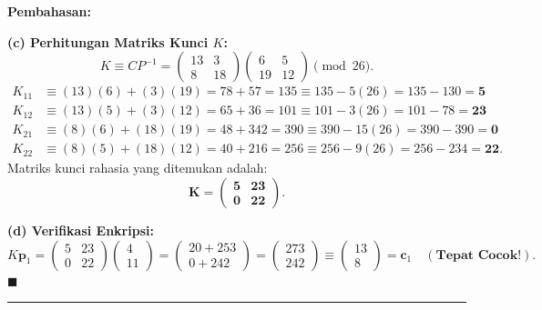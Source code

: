 \documentclass[11pt,a4paper]{article}
\newenvironment{solusi}{\noindent\textbf{\textsf{Pembahasan:}}\par\vspace{0.2em}}{\hfill$\blacksquare$\vspace{1em}\par\hrule\vspace{1em}}
\begin{document}
\begin{solusi}
\vspace{0.2cm}
\textbf{(c) Perhitungan Matriks Kunci $K$:}
\[
K \equiv C P^{-1} = \begin{pmatrix} 13 & 3 \\ 8 & 18 \end{pmatrix} \begin{pmatrix} 6 & 5 \\ 19 & 12 \end{pmatrix} \pmod{26}.
\]
\begin{align*}
K_{11} &\equiv (13)(6) + (3)(19) = 78 + 57 = 135 \equiv 135 - 5(26) = 135 - 130 = \mathbf{5} \\
K_{12} &\equiv (13)(5) + (3)(12) = 65 + 36 = 101 \equiv 101 - 3(26) = 101 - 78 = \mathbf{23} \\
K_{21} &\equiv (8)(6) + (18)(19) = 48 + 342 = 390 \equiv 390 - 15(26) = 390 - 390 = \mathbf{0} \\
K_{22} &\equiv (8)(5) + (18)(12) = 40 + 216 = 256 \equiv 256 - 9(26) = 256 - 234 = \mathbf{22}.
\end{align*}
Matriks kunci rahasia yang ditemukan adalah:
\[
\mathbf{K = \begin{pmatrix} 5 & 23 \\ 0 & 22 \end{pmatrix}}.
\]

\vspace{0.2cm}
\textbf{(d) Verifikasi Enkripsi:}
\[
K \mathbf{p}_1 = \begin{pmatrix} 5 & 23 \\ 0 & 22 \end{pmatrix} \begin{pmatrix} 4 \\ 11 \end{pmatrix} = \begin{pmatrix} 20 + 253 \\ 0 + 242 \end{pmatrix} = \begin{pmatrix} 273 \\ 242 \end{pmatrix} \equiv \begin{pmatrix} 13 \\ 8 \end{pmatrix} = \mathbf{c}_1 \quad (\textbf{Tepat Cocok!}).
\]
\end{solusi}

\end{document}
